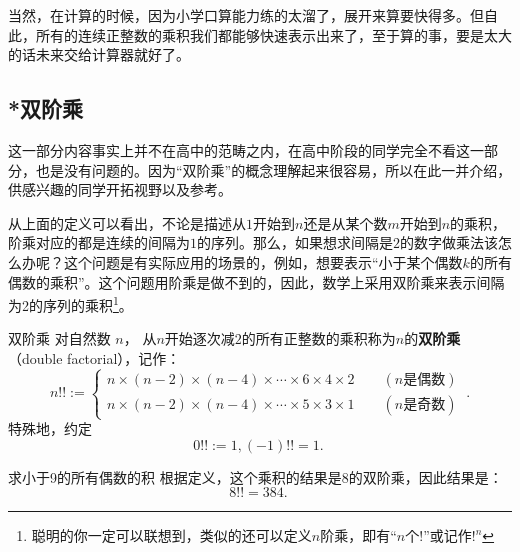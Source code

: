 当然，在计算的时候，因为小学口算能力练的太溜了，展开来算要快得多。但自此，所有的连续正整数的乘积我们都能够快速表示出来了，至于算的事，要是太大的话未来交给计算器就好了。

\subsection{*双阶乘}

这一部分内容事实上并不在高中的范畴之内，在高中阶段的同学完全不看这一部分，也是没有问题的。因为“双阶乘”的概念理解起来很容易，所以在此一并介绍，供感兴趣的同学开拓视野以及参考。

从上面的定义可以看出，不论是描述从$1$开始到$n$还是从某个数$m$开始到$n$的乘积，阶乘对应的都是连续的间隔为$1$的序列。那么，如果想求间隔是$2$的数字做乘法该怎么办呢？这个问题是有实际应用的场景的，例如，想要表示“小于某个偶数$k$的所有偶数的乘积”。这个问题用阶乘是做不到的，因此，数学上采用双阶乘来表示间隔为2的序列的乘积\footnote{聪明的你一定可以联想到，类似的还可以定义$n$阶乘，即有“$n$个$!$”或记作$!^n$}。

\begin{definition}{双阶乘}
对自然数 $n$， 从$n$开始逐次减$2$的所有正整数的乘积称为$n$的\textbf{双阶乘}（double factorial），记作：
\begin{equation}
n!! :=
\begin{cases}
n \times (n-2) \times (n-4)\times \cdots \times6\times4\times 2\qquad (n\text{是偶数})\\  
n \times (n-2) \times (n-4)\times \cdots \times5\times3\times 1\qquad (n\text{是奇数})
\end{cases} ~.
\end{equation}
特殊地，约定
\begin{equation}
0!! := 1,(-1)!!=1.~
\end{equation}
\end{definition}
\begin{example}{求小于9的所有偶数的积}
根据定义，这个乘积的结果是8的双阶乘，因此结果是：
$$8!!=384.~$$
\end{example}
